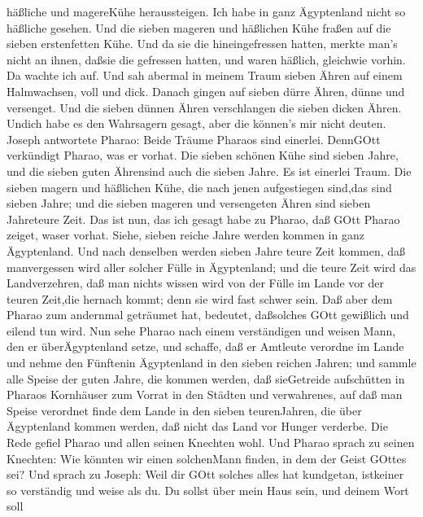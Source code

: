 häßliche und magereKühe heraussteigen. Ich habe in ganz Ägyptenland
nicht so häßliche gesehen.  Und die sieben mageren und
häßlichen Kühe fraßen auf die sieben erstenfetten Kühe. 
Und da sie die hineingefressen hatten, merkte man's nicht an ihnen,
daßsie die gefressen hatten, und waren häßlich, gleichwie vorhin. Da
wachte ich auf.  Und sah abermal in meinem Traum sieben
Ähren auf einem Halmwachsen, voll und dick.  Danach gingen
auf sieben dürre Ähren, dünne und versenget.  Und die
sieben dünnen Ähren verschlangen die sieben dicken Ähren. Undich habe es
den Wahrsagern gesagt, aber die können's mir nicht deuten. 
Joseph antwortete Pharao: Beide Träume Pharaos sind einerlei. DennGOtt
verkündigt Pharao, was er vorhat.  Die sieben schönen Kühe
sind sieben Jahre, und die sieben guten Ährensind auch die sieben Jahre.
Es ist einerlei Traum.  Die sieben magern und häßlichen
Kühe, die nach jenen aufgestiegen sind,das sind sieben Jahre; und die
sieben mageren und versengeten Ähren sind sieben Jahreteure Zeit.
 Das ist nun, das ich gesagt habe zu Pharao, daß GOtt
Pharao zeiget, waser vorhat.  Siehe, sieben reiche Jahre
werden kommen in ganz Ägyptenland.  Und nach denselben
werden sieben Jahre teure Zeit kommen, daß manvergessen wird aller
solcher Fülle in Ägyptenland; und die teure Zeit wird das Landverzehren,
 daß man nichts wissen wird von der Fülle im Lande vor der
teuren Zeit,die hernach kommt; denn sie wird fast schwer sein.
 Daß aber dem Pharao zum andernmal geträumet hat, bedeutet,
daßsolches GOtt gewißlich und eilend tun wird.  Nun sehe
Pharao nach einem verständigen und weisen Mann, den er überÄgyptenland
setze,  und schaffe, daß er Amtleute verordne im Lande und
nehme den Fünftenin Ägyptenland in den sieben reichen Jahren;
 und sammle alle Speise der guten Jahre, die kommen werden,
daß sieGetreide aufschütten in Pharaos Kornhäuser zum Vorrat in den
Städten und verwahrenes,  auf daß man Speise verordnet
finde dem Lande in den sieben teurenJahren, die über Ägyptenland kommen
werden, daß nicht das Land vor Hunger verderbe.  Die Rede
gefiel Pharao und allen seinen Knechten wohl.  Und Pharao
sprach zu seinen Knechten: Wie könnten wir einen solchenMann finden, in
dem der Geist GOttes sei?  Und sprach zu Joseph: Weil dir
GOtt solches alles hat kundgetan, istkeiner so verständig und weise als
du.  Du sollst über mein Haus sein, und deinem Wort soll
